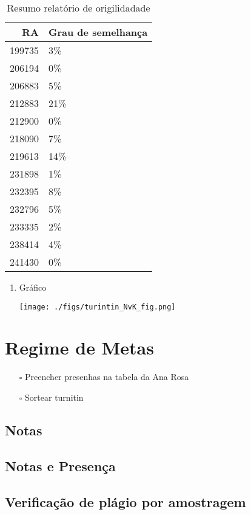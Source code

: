 \documentclass[11pt]{article}
\begin{document}
\begin{table}[htbp]
\caption{\label{TurnitinNvK}Resumo relatório de origilidadade}
\centering
\begin{tabular}{rl}
\hline
RA & Grau de semelhança\\
\hline
199735 & 3\%\\
206194 & 0\%\\
206883 & 5\%\\
212883 & 21\%\\
212900 & 0\%\\
218090 & 7\%\\
219613 & 14\%\\
231898 & 1\%\\
232395 & 8\%\\
232796 & 5\%\\
233335 & 2\%\\
238414 & 4\%\\
241430 & 0\%\\
\hline
\end{tabular}
\end{table}
\begin{enumerate}
\item Gráfico
\label{sec:org4757c6f}
\begin{center}
\texttt{[image: ./figs/turintin\_NvK\_fig.png]}
\end{center}
\end{enumerate}

\section{Regime de Metas}
\label{sec:org2436039}

\begin{itemize}
\item[{$\square$}] Preencher presenhas na tabela da Ana Rosa
\item[{$\square$}] Sortear turnitin
\end{itemize}
\subsection{Notas}
\label{sec:org1e241c4}
\subsection{Notas e Presença}
\label{sec:orgb8eaf57}
\subsection{Verificação de plágio por amostragem}
\label{sec:org2bc993c}
\end{document}
